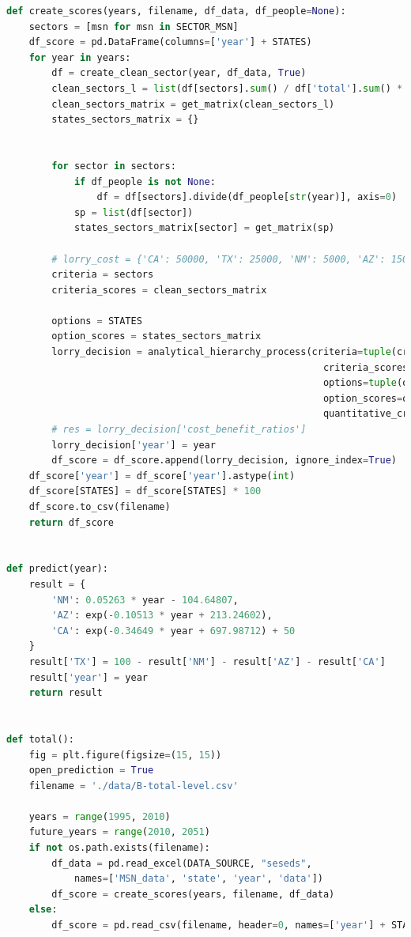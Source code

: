 \documentclass[a4paper,11pt]{article}
\begin{document}
\begin{appendices}
\begin{lstlisting}[language=Python, caption=score.py]
def create_scores(years, filename, df_data, df_people=None):
    sectors = [msn for msn in SECTOR_MSN]
    df_score = pd.DataFrame(columns=['year'] + STATES)
    for year in years:
        df = create_clean_sector(year, df_data, True)
        clean_sectors_l = list(df[sectors].sum() / df['total'].sum() * 100)
        clean_sectors_matrix = get_matrix(clean_sectors_l)
        states_sectors_matrix = {}


        for sector in sectors:
            if df_people is not None:
                df = df[sectors].divide(df_people[str(year)], axis=0)
            sp = list(df[sector])
            states_sectors_matrix[sector] = get_matrix(sp)

        # lorry_cost = {'CA': 50000, 'TX': 25000, 'NM': 5000, 'AZ': 15000}
        criteria = sectors
        criteria_scores = clean_sectors_matrix

        options = STATES
        option_scores = states_sectors_matrix
        lorry_decision = analytical_hierarchy_process(criteria=tuple(criteria),
                                                        criteria_scores=criteria_scores,
                                                        options=tuple(options),
                                                        option_scores=option_scores,
                                                        quantitative_criteria=())
        # res = lorry_decision['cost_benefit_ratios']
        lorry_decision['year'] = year
        df_score = df_score.append(lorry_decision, ignore_index=True)
    df_score['year'] = df_score['year'].astype(int)
    df_score[STATES] = df_score[STATES] * 100
    df_score.to_csv(filename)
    return df_score


def predict(year):
    result = {
        'NM': 0.05263 * year - 104.64807,
        'AZ': exp(-0.10513 * year + 213.24602),
        'CA': exp(-0.34649 * year + 697.98712) + 50
    }
    result['TX'] = 100 - result['NM'] - result['AZ'] - result['CA']
    result['year'] = year
    return result


def total():
    fig = plt.figure(figsize=(15, 15))
    open_prediction = True
    filename = './data/B-total-level.csv'

    years = range(1995, 2010)
    future_years = range(2010, 2051)
    if not os.path.exists(filename):
        df_data = pd.read_excel(DATA_SOURCE, "seseds", 
            names=['MSN_data', 'state', 'year', 'data'])
        df_score = create_scores(years, filename, df_data)
    else:
        df_score = pd.read_csv(filename, header=0, names=['year'] + STATES)


\end{lstlisting}
\end{appendices}
\end{document}
